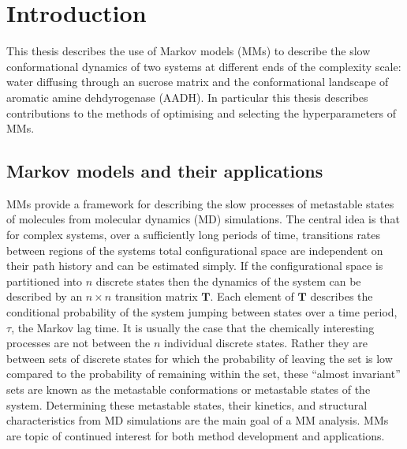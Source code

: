 %
%
\let\textcircled=\pgftextcircled
\chapter{Introduction}
\label{chap:intro}
This thesis describes the use of Markov models (MMs) to describe the slow conformational  dynamics of two systems at different ends of the complexity scale: water diffusing through an sucrose matrix and the conformational landscape of aromatic amine dehdyrogenase (AADH). In particular this thesis describes contributions to the methods of optimising and selecting the hyperparameters of MMs. 

\section{Markov models and their applications}
MMs provide a framework for describing the slow processes of metastable states of molecules from molecular dynamics (MD) simulations\cite{prinzMarkovModelsMolecular2011}. The central idea\cite{zwanzigClassicalDynamicsContinuous1983a} is that for complex systems, over a sufficiently long periods of time, transitions rates between regions of the systems total configurational space are independent on their path history and can be estimated simply. If the configurational space is partitioned into $n$ discrete states then the dynamics of the system can be described by an $n\times n$ transition matrix $\mathbf{T}$\cite{prinzMarkovModelsMolecular2011}. Each element of $\mathbf{T}$ describes the conditional probability of the system jumping between states\cite{prinzMarkovModelsMolecular2011} over a time period, $\tau$, the Markov lag time. It is usually the case that the chemically interesting processes are not between the $n$ individual discrete states. Rather they are between sets of discrete states for which the probability of leaving the set is low compared to the probability of remaining within the set\cite{schutteDirectApproachConformational1999}, these ``almost invariant'' sets are known as the metastable conformations or metastable states of the system. Determining these metastable states, their kinetics, and structural characteristics from MD simulations are the main goal of a MM analysis. MMs are  topic of continued interest\cite{husicMarkovStateModels2018,noeMarkovModelsMolecular2019b, wangConstructingMarkovState2018c} for both method development and applications.  

